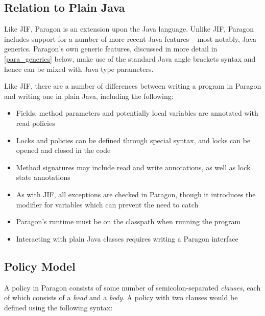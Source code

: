 \subsection{Relation to Plain Java}

Like JIF, Paragon is an extension upon the Java language. Unlike JIF, Paragon includes support for a number of more recent Java features -- most notably, Java generics. Paragon's own generic features, discussed in more detail in \ref{para_generics} below, make use of the standard Java angle brackets syntax and hence can be mixed with Java type parameters.

Like JIF, there are a number of differences between writing a program in Paragon and writing one in plain Java, including the following:

\begin{itemize}
	
	\item Fields, method parameters and potentially local variables are annotated with read policies
	
	\item Locks and policies can be defined through special syntax, and locks can be opened and closed in the code
	
	\item Method signatures may include read and write annotations, as well as lock state annotations
	
	\item As with JIF, all exceptions are checked in Paragon, though it introduces the  modifier for variables which can prevent the need to catch 
	
	\item Paragon's runtime must be on the classpath when running the program
	
	\item Interacting with plain Java classes requires writing a Paragon interface
	
\end{itemize}

\subsection{Policy Model}

A policy in Paragon consists of some number of semicolon-separated \textit{clauses}, each of which consists of a \textit{head} and a \textit{body}. A policy  with two clauses would be defined using the following syntax:

